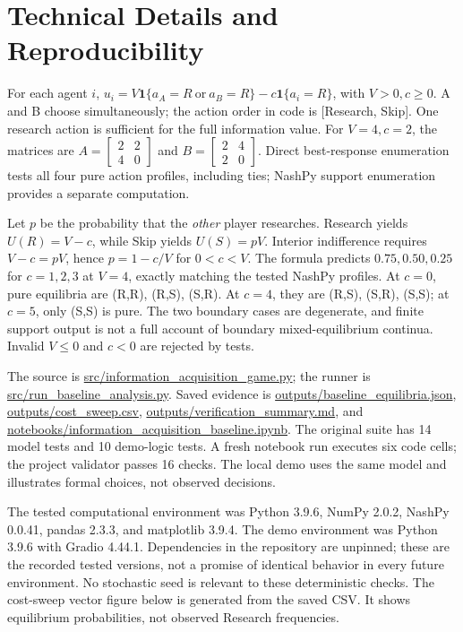 \section{Technical Details and Reproducibility}
\label{app:technical}
For each agent \(i\), \(u_i=V\mathbf{1}\{a_A=R\ \mathrm{or}\ a_B=R\}-c\mathbf{1}\{a_i=R\}\), with \(V>0,c\geq0\). A and B choose simultaneously; the action order in code is [Research, Skip]. One research action is sufficient for the full information value. For \(V=4,c=2\), the matrices are \(A=\left[\begin{smallmatrix}2&2\\4&0\end{smallmatrix}\right]\) and \(B=\left[\begin{smallmatrix}2&4\\2&0\end{smallmatrix}\right]\). Direct best-response enumeration tests all four pure action profiles, including ties; NashPy support enumeration provides a separate computation.

Let \(p\) be the probability that the \emph{other} player researches. Research yields \(U(R)=V-c\), while Skip yields \(U(S)=pV\). Interior indifference requires \(V-c=pV\), hence \(p=1-c/V\) for \(0<c<V\). The formula predicts \(0.75,0.50,0.25\) for \(c=1,2,3\) at \(V=4\), exactly matching the tested NashPy profiles. At \(c=0\), pure equilibria are (R,R), (R,S), (S,R). At \(c=4\), they are (R,S), (S,R), (S,S); at \(c=5\), only (S,S) is pure. The two boundary cases are degenerate, and finite support output is not a full account of boundary mixed-equilibrium continua. Invalid \(V\leq0\) and \(c<0\) are rejected by tests.

The source is \url{src/information_acquisition_game.py}; the runner is \url{src/run_baseline_analysis.py}. Saved evidence is \url{outputs/baseline_equilibria.json}, \url{outputs/cost_sweep.csv}, \url{outputs/verification_summary.md}, and \url{notebooks/information_acquisition_baseline.ipynb}. The original suite has 14 model tests and 10 demo-logic tests. A fresh notebook run executes six code cells; the project validator passes 16 checks. The local demo uses the same model and illustrates formal choices, not observed decisions.

The tested computational environment was Python 3.9.6, NumPy 2.0.2, NashPy 0.0.41, pandas 2.3.3, and matplotlib 3.9.4. The demo environment was Python 3.9.6 with Gradio 4.44.1. Dependencies in the repository are unpinned; these are the recorded tested versions, not a promise of identical behavior in every future environment. No stochastic seed is relevant to these deterministic checks. The cost-sweep vector figure below is generated from the saved CSV. It shows equilibrium probabilities, not observed Research frequencies.

